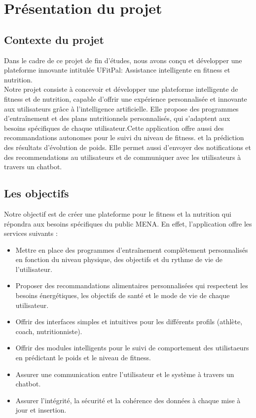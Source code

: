 \documentclass[a4paper,12pt]{report}
\begin{document}
\section{Présentation du projet}

\subsection{Contexte du projet}
Dans le cadre de ce projet de fin d'études, nous avons conçu et développer une plateforme innovante intitulée UFitPal: Assistance intelligente en fitness et nutrition. \\
Notre projet consiste à concevoir et développer une plateforme intelligente de fitness et de nutrition, capable d'offrir une expérience personnalisée et innovante aux utilisateurs grâce à l'intelligence artificielle. Elle propose des programmes d’entraînement et des plans nutritionnels personnalisés, qui s'adaptent aux besoins spécifiques de chaque utilisateur.Cette application offre aussi des recommandations autonomes pour le suivi du niveau de fitness. et la prédiction des résultats d'évolution de poids. Elle permet aussi d'envoyer des notifications et des recommendations au utilisateurs et de communiquer avec les utilisateurs à travers un chatbot.

\subsection{Les objectifs}
Notre objectif est de créer une plateforme pour le fitness et la nutrition qui répondra aux besoins spécifiques du public MENA. En effet, l'application offre les services suivants :

\begin{itemize}
  \item Mettre en place des programmes d'entraînement complètement personnalisés en fonction du niveau physique, des objectifs et du rythme de vie de l'utilisateur.
   \item Proposer des recommandations alimentaires personnalisées qui respectent les besoins énergétiques, les objectifs de santé et le mode de vie de chaque utilisateur.
  \item Offrir des interfaces simples et intuitives pour les différents profils (athlète, coach, nutritionniste).
  \item Offrir des modules intelligents pour le suivi de comportement des utilistaeurs en prédictant le poids et le niveau de fitness. 
  \item Assurer une communication entre l'utilisateur et le système à travers un chatbot.
  \item Assurer l'intégrité, la sécurité et la cohérence des données à chaque mise à jour et insertion.
  \end{itemize}
  
\end{document}
